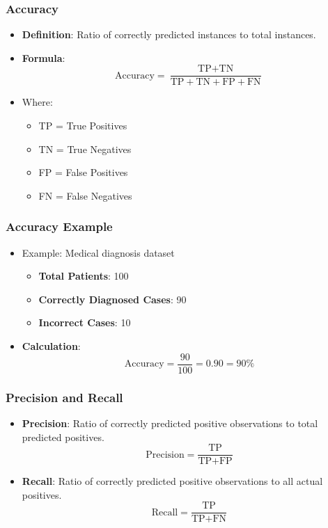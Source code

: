 \documentclass[aspectratio=169]{beamer}
\begin{document}
\begin{frame}[fragile]
    \frametitle{Accuracy}
    \begin{itemize}
        \item \textbf{Definition}: Ratio of correctly predicted instances to total instances.
        \item \textbf{Formula}:
        \begin{equation}
            \text{Accuracy} = \frac{\text{TP} + \text{TN}}{\text{TP} + \text{TN} + \text{FP} + \text{FN}}
        \end{equation}
        \item Where:
        \begin{itemize}
            \item TP = True Positives
            \item TN = True Negatives
            \item FP = False Positives
            \item FN = False Negatives
        \end{itemize}
    \end{itemize}
\end{frame}

\begin{frame}[fragile]
    \frametitle{Accuracy Example}
    \begin{itemize}
        \item Example: Medical diagnosis dataset
        \begin{itemize}
            \item \textbf{Total Patients}: 100
            \item \textbf{Correctly Diagnosed Cases}: 90
            \item \textbf{Incorrect Cases}: 10
        \end{itemize}
        \item \textbf{Calculation}:
        \begin{equation}
            \text{Accuracy} = \frac{90}{100} = 0.90 = 90\%
        \end{equation}
    \end{itemize}
\end{frame}

\begin{frame}[fragile]
    \frametitle{Precision and Recall}
    \begin{itemize}
        \item \textbf{Precision}: Ratio of correctly predicted positive observations to total predicted positives.
        \begin{equation}
            \text{Precision} = \frac{\text{TP}}{\text{TP} + \text{FP}}
        \end{equation}
        \item \textbf{Recall}: Ratio of correctly predicted positive observations to all actual positives.
        \begin{equation}
            \text{Recall} = \frac{\text{TP}}{\text{TP} + \text{FN}}
        \end{equation}
    \end{itemize}
\end{frame}
\end{document}
